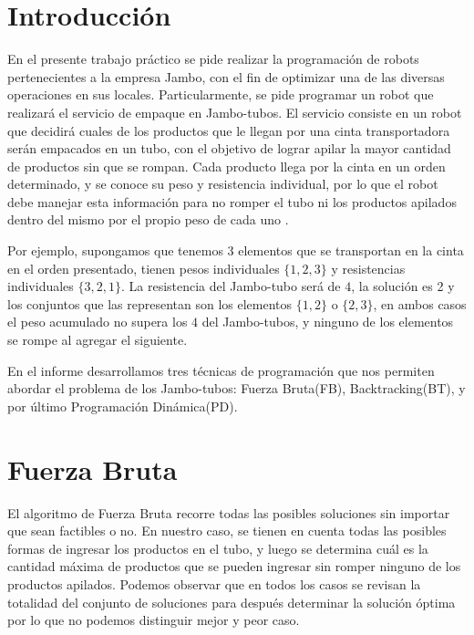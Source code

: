 \documentclass[10pt,a4paper]{article}
\begin{document}

\subtitulo{}

\fecha{\today}



\maketitle

\tableofcontents

\newpage

\setcounter{page}{1}

\section{Introducción} \label{sec:introduccion}
En el presente trabajo práctico se pide realizar la programación de robots pertenecientes a la empresa Jambo, con el fin de optimizar una de las diversas operaciones en sus locales. Particularmente, se pide programar un robot que realizará el servicio de empaque en Jambo-tubos. El servicio consiste en un robot que decidirá cuales de los productos que le llegan por una cinta transportadora serán empacados en un tubo, con el objetivo de lograr apilar la mayor cantidad de productos sin que se rompan. Cada producto llega por la cinta en un orden determinado, y se conoce su peso y resistencia individual, por lo que el robot debe manejar esta información para no romper el tubo ni los productos apilados dentro del mismo por el propio peso de cada uno \cite{ref:enunciado}. 

Por ejemplo, supongamos que tenemos 3 elementos que se transportan en la cinta en el orden presentado, tienen pesos individuales $\{1,2,3\}$ y resistencias individuales $\{3,2,1\}$. La resistencia del Jambo-tubo será de $4$, la solución es 2 y los conjuntos que las representan son los elementos $\{1,2\}$ o $\{2,3\}$, en ambos casos el peso acumulado no supera los $4$ del Jambo-tubos, y ninguno de los elementos se rompe al agregar el siguiente.

En el informe desarrollamos tres técnicas de programación que nos permiten abordar el problema de los Jambo-tubos: Fuerza Bruta(FB), Backtracking(BT), y por último Programación Dinámica(PD).

\section{Fuerza Bruta} \label{sec:fuerza_bruta}
El algoritmo de Fuerza Bruta recorre todas las posibles soluciones sin importar que sean factibles o no. En nuestro caso, se tienen en cuenta todas las posibles formas de ingresar los productos en el tubo, y luego se determina cuál es la cantidad máxima de productos que se pueden ingresar sin romper ninguno de los productos apilados. Podemos observar que en todos los casos se revisan la totalidad del conjunto de soluciones para después determinar la solución óptima por lo que no podemos distinguir mejor y peor caso.
\end{document}
